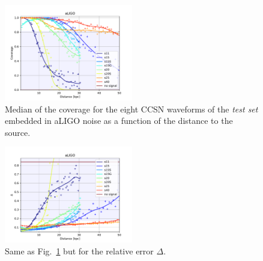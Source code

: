 \begin{figure}[t]
  \centering
  \includegraphics[width=0.5\textwidth]{plots/aLIGO_coverage_allwvfs}
 \caption{Median of the coverage for the eight CCSN waveforms of the {\it test set} embedded in aLIGO noise as a function of the  distance to the source. } \label{fig:aLIGO_cov_allwvf}
\end{figure}

\begin{figure}[t]
  \centering
  \includegraphics[width=0.5\textwidth]{plots/aLIGO_delta_allwvfs}
 \caption{Same as Fig.~\ref{fig:aLIGO_cov_allwvf} but for the relative error $\Delta$.}
\label{fig:aLIGO_prec_allwvf}
\end{figure}

